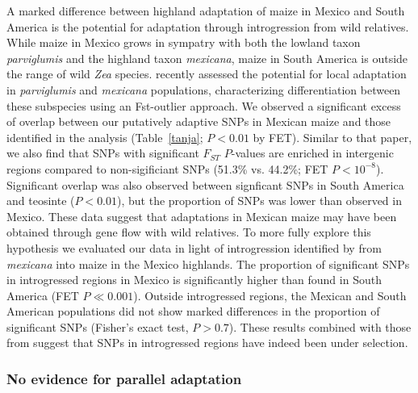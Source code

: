 {{A marked difference between highland adaptation of maize in Mexico and South America is the potential for adaptation through introgression from wild relatives.  While maize in Mexico grows in sympatry with both the lowland taxon \textit{parviglumis} and the highland taxon \textit{mexicana}, maize in South America is outside the range of wild \textit{Zea} species.
 \citep{Pyhajarvi2013} recently assessed the potential for local adaptation in \textit{parviglumis} and \textit{mexicana} populations, characterizing differentiation between these subspecies using an Fst-outlier approach.
We observed a significant excess of overlap between our putatively adaptive SNPs in Mexican maize and those identified in the \citep{Pyhajarvi2013} analysis (Table~\ref{tanja}; $P<0.01$ by FET). Similar to that paper, we also find that SNPs with significant $F_{ST}$ $P$-values are enriched in intergenic regions compared to non-sigificiant SNPs (51.3\% vs. 44.2\%; FET $P < 10^{-8}$). Significant overlap was also observed between signficant SNPs in South America and teosinte ($P<0.01$), but the proportion of SNPs was lower than observed in Mexico.  These data suggest that adaptations in Mexican maize may have been obtained through gene flow with wild relatives.  To more fully explore this hypothesis we evaluated our data in light of introgression identified by \citep{Profford_2013} from \textit{mexicana} into maize in the Mexico highlands.  
The proportion of significant SNPs in introgressed regions in Mexico is significantly higher than found in South America (FET $P\ll0.001$).
Outside introgressed regions, the Mexican and South American populations did not show marked differences in the proportion of significant SNPs (Fisher's exact test, $P>0.7$). These results combined with those from \citep{Profford_2013} suggest that SNPs in introgressed regions have indeed been under selection.  

\subsubsection{No evidence for parallel adaptation}

}}
